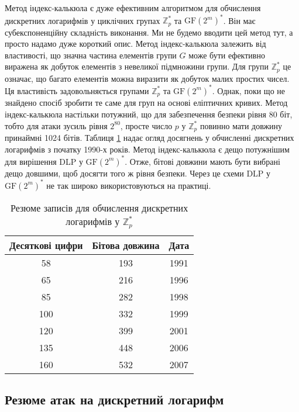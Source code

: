 \documentclass[12pt]{report}
\theoremstyle{definition}
\theoremstyle{plain}
\begin{document}
Метод індекс-калькюла є дуже ефективним алгоритмом для обчислення дискретних логарифмів у циклічних групах \( \mathbb{Z}^*_p \) та \( \text{GF}(2^m)^* \). Він має субекспоненційну складність виконання. Ми не будемо вводити цей метод тут, а просто надамо дуже короткий опис. Метод індекс-калькюла залежить від властивості, що значна частина елементів групи \( G \) може бути ефективно виражена як добуток елементів з невеликої підмножини групи. Для групи \( \mathbb{Z}^*_p \) це означає, що багато елементів можна виразити як добуток малих простих чисел. Ця властивість задовольняється групами \( \mathbb{Z}^*_p \) та \( \text{GF}(2^m)^* \). Однак, поки що не знайдено спосіб зробити те саме для груп на основі еліптичних кривих. Метод індекс-калькюла настільки потужний, що для забезпечення безпеки рівня 80 біт, тобто для атаки зусиль рівня \( 2^{80} \), просте число \( p \) у \( \mathbb{Z}^*_p \) повинно мати довжину принаймні 1024 бітів. Таблиця \ref{tab:DLP_records} надає огляд досягнень у обчисленні дискретних логарифмів з початку 1990-х років. Метод індекс-калькюла є дещо потужнішим для вирішення DLP у \( \text{GF}(2^m)^* \). Отже, бітові довжини мають бути вибрані дещо довшими, щоб досягти того ж рівня безпеки. Через це схеми DLP у \( \text{GF}(2^m)^* \) не так широко використовуються на практиці.

\begin{table}[h!]
\centering
\begin{tabular}{|c|c|c|}
\hline
\textbf{Десяткові цифри} & \textbf{Бітова довжина} & \textbf{Дата} \\
\hline
58 & 193 & 1991 \\
\hline
65 & 216 & 1996 \\
\hline
85 & 282 & 1998 \\
\hline
100 & 332 & 1999 \\
\hline
120 & 399 & 2001 \\
\hline
135 & 448 & 2006 \\
\hline
160 & 532 & 2007 \\
\hline
\end{tabular}
\caption{Резюме записів для обчислення дискретних логарифмів у \( \mathbb{Z}^*_p \)}
\label{tab:DLP_records}
\end{table}

\subsection{Резюме атак на дискретний логарифм}
\end{document}
